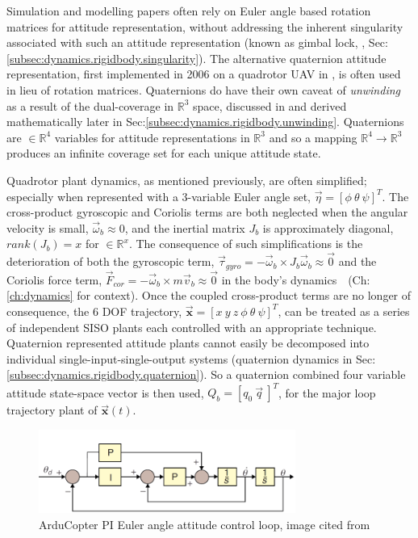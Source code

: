 Simulation and modelling papers often rely on Euler angle based rotation matrices for attitude representation, \cite{adaptivedisturbancecontrol, optimizedpidquadcopter, singleaxistilting, backsteppingquadcoptercontrol, fullquadcoptercontrol} without addressing the inherent singularity associated with such an attitude representation (known as gimbal lock, \cite{euleranglesingularity}, Sec:\ref{subsec:dynamics.rigidbody.singularity}). The alternative quaternion attitude representation, first implemented in 2006 on a quadrotor UAV in \cite{attitudestabilization}, is often used in lieu of rotation matrices. Quaternions do have their own caveat of \emph{unwinding} as a result of the dual-coverage in $\mathbb{R}^3$ space, discussed in \cite{unwinding} and derived mathematically later in Sec:\ref{subsec:dynamics.rigidbody.unwinding}. Quaternions are $\in\mathbb{R}^4$ variables for attitude representations in $\mathbb{R}^3$ and so a mapping $\mathbb{R}^4\rightarrow\mathbb{R}^3$ produces an infinite coverage set for each unique attitude state.
\par
Quadrotor plant dynamics, as mentioned previously, are often simplified; especially when represented with a 3-variable Euler angle set, $\vec{\eta} = [\phi ~\theta ~\psi]^T$. The cross-product gyroscopic and Coriolis terms are both neglected when the angular velocity is small, $\vec{\omega}_b \approx 0$, and the inertial matrix $J_b$ is approximately diagonal, $rank(J_b)= x$ for $\in\mathbb{R}^x$. The consequence of such simplifications is the deterioration of both the gyroscopic term, $\vec{\tau}_{gyro}=-\vec{\omega}_b \times J_b\vec{\omega}_b \approx \vec{0}$ and the  Coriolis force term, $\vec{F}_{cor}=-\vec{\omega}_b \times m\vec{v}_b \approx \vec{0}$ in the body's dynamics~~(Ch:\ref{ch:dynamics} for context). Once the coupled cross-product terms are no longer of consequence, the 6 DOF trajectory, $\vec{\mathbf{x}}=[x ~y ~z ~\phi ~\theta ~\psi]^T$, can be treated as a series of independent SISO plants each controlled with an appropriate technique. Quaternion represented attitude plants cannot easily be decomposed into individual single-input-single-output systems (quaternion dynamics in Sec:\ref{subsec:dynamics.rigidbody.quaternion}). So a quaternion combined four variable attitude state-space vector is then used, $Q_b = [q_0 ~\vec{q}\>]^T$, for the major loop trajectory plant of $\vec{\mathbf{x}}(t)$.
\par
\begin{figure}[hbtp]
\centering
\includegraphics[width=0.75\textwidth]{figs/arducopter-pi}
\caption{ArduCopter PI Euler angle attitude control loop, image cited from~\cite{buildyourownquad}}
\label{fig:arducopter-pi}
\vspace{-10pt}
\end{figure}

